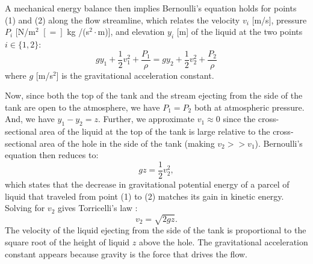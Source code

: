 \documentclass[a4paper,fleqn]{cas-sc}
\begin{document}
	A mechanical energy balance then implies Bernoulli's equation \cite{welty2020fundamentals} holds for points (1) and (2) along the flow streamline, which relates the velocity $v_i$ [m/s], pressure $P_i$ [N/m$^2$ $[=]$ kg /(s$^2\cdot$m)], and elevation $y_i$ [m] of the liquid at the two points $i\in\{1,2\}$:
	\begin{equation}
	g y_1 + \frac{1}{2} v_1^2 + \frac{P_1}{\rho} = gy_2 + \frac{1}{2} v_2^2 + \frac{P_2}{\rho} 
	\end{equation}
	where $g$ [m/s$^2$] is the gravitational acceleration constant. 
	
	Now, since both the top of the tank and the stream ejecting from the side of the tank are open to the atmosphere, we have $P_1=P_2$ both at atmospheric pressure. And, we have $y_1-y_2=z$. Further, we approximate $v_1\approx 0$ since the cross-sectional area of the liquid at the top of the tank is large relative to the cross-sectional area of the hole in the side of the tank (making $v_2 >> v_1$). Bernoulli's equation then reduces to:
	\begin{equation}
	g z  = \frac{1}{2} v_2^2,
	\end{equation}
	which states that the decrease in gravitational potential energy of a parcel of liquid that traveled from point (1) to (2) matches its gain in kinetic energy. Solving for $v_2$ gives Torricelli's law \cite{driver1998torricelli}:
	\begin{equation}
	v_2 = \sqrt{2gz}.
	\end{equation}
	The velocity of the liquid ejecting from the side of the tank is proportional to the square root of the height of liquid $z$ above the hole. The gravitational acceleration constant appears because gravity is the force that drives the flow.





\end{document}
